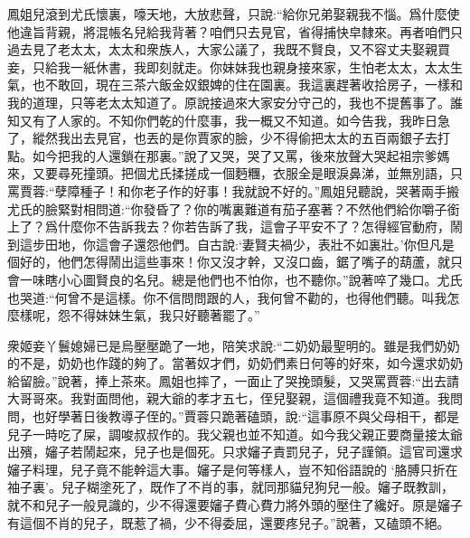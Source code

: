 \begin{parag}
    鳳姐兒滾到尤氏懷裏，嚎天地，大放悲聲，只說:“給你兄弟娶親我不惱。爲什麼使他違旨背親，將混帳名兒給我背著？咱們只去見官，省得捕快皁隸來。再者咱們只過去見了老太太，太太和衆族人，大家公議了，我既不賢良，又不容丈夫娶親買妾，只給我一紙休書，我即刻就走。你妹妹我也親身接來家，生怕老太太，太太生氣，也不敢回，現在三茶六飯金奴銀婢的住在園裏。我這裏趕著收拾房子，一樣和我的道理，只等老太太知道了。原說接過來大家安分守己的，我也不提舊事了。誰知又有了人家的。不知你們乾的什麼事，我一概又不知道。如今告我，我昨日急了，縱然我出去見官，也丟的是你賈家的臉，少不得偷把太太的五百兩銀子去打點。如今把我的人還鎖在那裏。”說了又哭，哭了又罵，後來放聲大哭起祖宗爹媽來，又要尋死撞頭。把個尤氏揉搓成一個麪糰，衣服全是眼淚鼻涕，並無別語，只罵賈蓉:“孽障種子！和你老子作的好事！我就說不好的。”鳳姐兒聽說，哭著兩手搬尤氏的臉緊對相問道:“你發昏了？你的嘴裏難道有茄子塞著？不然他們給你嚼子銜上了？爲什麼你不告訴我去？你若告訴了我，這會子平安不了？怎得經官動府，鬧到這步田地，你這會子還怨他們。自古說:‘妻賢夫禍少，表壯不如裏壯。’你但凡是個好的，他們怎得鬧出這些事來！你又沒才幹，又沒口齒，鋸了嘴子的葫蘆，就只會一味瞎小心圖賢良的名兒。總是他們也不怕你，也不聽你。”說著啐了幾口。尤氏也哭道:“何曾不是這樣。你不信問問跟的人，我何曾不勸的，也得他們聽。叫我怎麼樣呢，怨不得妹妹生氣，我只好聽著罷了。”
\end{parag}


\begin{parag}
    衆姬妾丫鬟媳婦已是烏壓壓跪了一地，陪笑求說:“二奶奶最聖明的。雖是我們奶奶的不是，奶奶也作踐的夠了。當著奴才們，奶奶們素日何等的好來，如今還求奶奶給留臉。”說著，捧上茶來。鳳姐也摔了，一面止了哭挽頭髮，又哭罵賈蓉:“出去請大哥哥來。我對面問他，親大爺的孝才五七，侄兒娶親，這個禮我竟不知道。我問問，也好學著日後教導子侄的。”賈蓉只跪著磕頭，說:“這事原不與父母相干，都是兒子一時吃了屎，調唆叔叔作的。我父親也並不知道。如今我父親正要商量接太爺出殯，嬸子若鬧起來，兒子也是個死。只求嬸子責罰兒子，兒子謹領。這官司還求嬸子料理，兒子竟不能幹這大事。嬸子是何等樣人，豈不知俗語說的 ‘胳膊只折在袖子裏’。兒子糊塗死了，既作了不肖的事，就同那貓兒狗兒一般。嬸子既教訓，就不和兒子一般見識的，少不得還要嬸子費心費力將外頭的壓住了纔好。原是嬸子有這個不肖的兒子，既惹了禍，少不得委屈，還要疼兒子。”說著，又磕頭不絕。
\end{parag}



